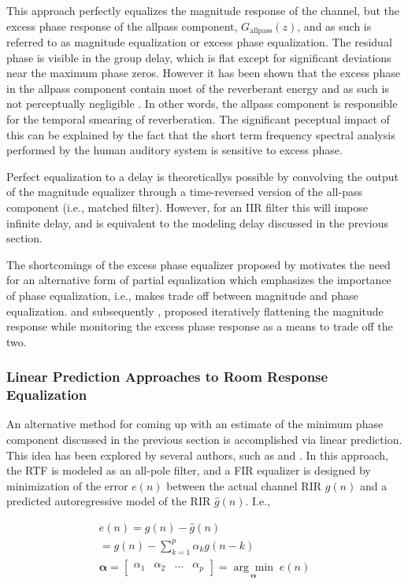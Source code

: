 This approach perfectly equalizes the magnitude response of the channel, but the excess phase response of the allpass component, $G_{\mathrm{allpass}}(z)$,  and as such is referred to as magnitude equalization or excess phase equalization. The residual phase is visible in the group delay, which is flat except for significant deviations near the maximum phase zeros. However it has been shown that the excess phase in the allpass component contain most of the reverberant energy and as such is not perceptually negligible \citep{johansen1996excess}. In other words, the allpass component is responsible for the temporal smearing of reverberation. The significant peceptual impact of this can be explained by the fact that the short term frequency spectral analysis performed by the human auditory system is sensitive to excess phase.

Perfect equalization to a delay is theoreticallys possible by convolving the output of the magnitude equalizer through a time-reversed version of the all-pass component (i.e., matched filter). However, for an IIR filter this will impose infinite delay, and is equivalent to the modeling delay discussed in the previous section.

The shortcomings of the excess phase equalizer proposed by \cite{neely1979invertibility} motivates the need for an alternative form of partial equalization which emphasizes the importance of phase equalization, i.e., makes trade off between magnitude and phase equalization. \cite{radlovic2000nonminimum} and subsequently \cite{maamar2006partial}, proposed iteratively flattening the magnitude response while monitoring the excess phase response as a means to trade off the two.

\subsubsection{Linear Prediction Approaches to Room Response Equalization}

An alternative method for coming up with an estimate of the minimum phase component discussed in the previous section is accomplished via linear prediction. This idea has been explored by several authors, such as \cite{mourjopoulos1991pole} and \cite{haneda1997multiple}. In this approach, the RTF is modeled as an all-pole filter, and a FIR equalizer is designed by minimization of the error $e(n)$ between the actual channel RIR $g(n)$ and a predicted autoregressive model of the RIR $\hat{g}(n)$. I.e.,

\begin{eqnarray}
	e(n)= g(n) - \hat{g}(n) \\
	=  g(n) - \sum_{k=1}^{p}\alpha_k g(n-k) \\
	\boldsymbol{\alpha}=\begin{bmatrix} \alpha_1 & \alpha_2 & \dots & \alpha_p \end{bmatrix} = \underset{\boldsymbol{\alpha}}{\arg\min}\;e(n)
\end{eqnarray}

